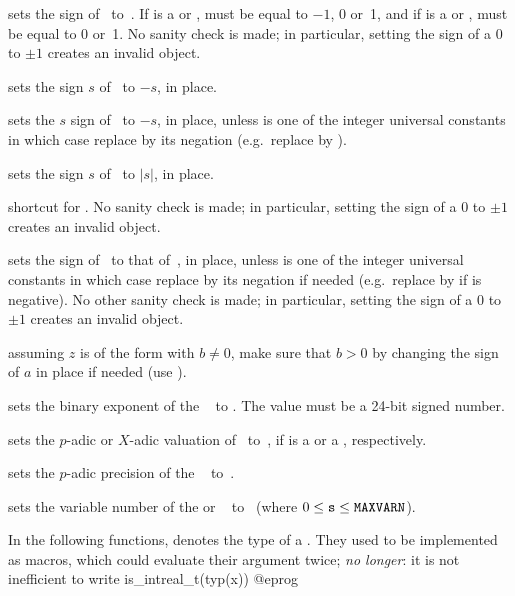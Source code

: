  sets the sign of~ to~.
If  is a  or ,  must be equal to $-1$, 0
or~1, and if  is a  or ,  must be equal to 0
or~1. No sanity check is made; in particular, setting the sign of a
$0$  to $\pm1$ creates an invalid object.

 sets the sign $s$ of~ to $-s$, in place.

 sets the $s$ sign of~ to $-s$, in
place, unless  is one of the integer universal constants in which case
replace  by its negation (e.g.~replace  by ).

 sets the sign $s$ of~ to $|s|$, in place.

 shortcut for .
No sanity check is made; in particular, setting the sign of a
$0$  to $\pm1$ creates an invalid object.

 sets the sign of~ to that
of~, in place, unless  is one of the integer universal
constants in which case replace  by its negation if needed
(e.g.~replace  by  if  is negative). No other
sanity check is made; in particular, setting the sign of a $0$
 to $\pm1$ creates an invalid object.

 assuming $z$ is of the form 
with $b\neq 0$, make sure that $b > 0$ by changing the sign of $a$ in place if
needed (use ).

 sets the binary exponent of the
~ to . The value  must be a 24-bit signed
number.

 sets the $p$-adic or $X$-adic valuation
of~ to~, if  is a  or a ,
respectively.

 sets the $p$-adic precision of the
~ to~.

 sets the variable number of the 
or ~ to~ (where $0\le {\tt s}\le{\tt MAXVARN}$).

\label{se:typegroup}
In the following functions,  denotes the type of a .
They used to be implemented as macros, which could evaluate their argument
twice; \emph{no longer}: it is not inefficient to write
\bprog
  is_intreal_t(typ(x))
@eprog

